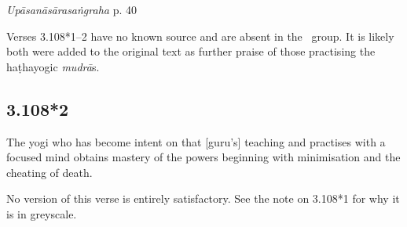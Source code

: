 \begin{ekdosis}

\begin{testimonia}[hp03_108_1]
\emph{Upāsanāsārasaṅgraha} p. 40 %
\begin{versinnote}
\end{versinnote}
\end{testimonia}

\begin{philcomm}[hp03_108_1]
Verses 3.108*1–2 have no known source and are absent in the \textalpha\ group. It is likely both were added to the original text as further praise of those practising the haṭhayogic \emph{mudrā}s.
\end{philcomm}


\subsection*{3.108*2}
\begin{translation}[hp03_108_2]
The yogi who has become intent on that [guru's] teaching and practises with a focused mind obtains mastery of the powers beginning with minimisation and the cheating of death.
\end{translation}



\begin{philcomm}[hp03_108_2]
No version of this verse is entirely satisfactory. See the note on 3.108*1 for why it is in greyscale.
\end{philcomm}

\end{ekdosis}

